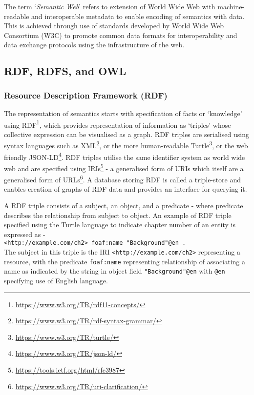 The term `\textit{Semantic Web}' refers to extension of World Wide Web with machine-readable and interoperable metadata to enable encoding of semantics with data.
This is achieved through use of standards developed by World Wide Web Consortium (W3C) to promote common data formats for interoperability and data exchange protocols using the infrastructure of the web.

\subsection{RDF, RDFS, and OWL}

\subsubsection{Resource Description Framework (RDF)}
The representation of semantics starts with specification of facts or `knowledge' using RDF\footnote{\url{https://www.w3.org/TR/rdf11-concepts/}}, which provides representation of information as `triples' whose collective expression can be visualised as a graph.
RDF triples are serialised using syntax languages such as XML\footnote{\url{https://www.w3.org/TR/rdf-syntax-grammar/}}, or the more human-readable Turtle\footnote{\url{https://www.w3.org/TR/turtle/}}, or the web friendly JSON-LD\footnote{\url{https://www.w3.org/TR/json-ld/}}.
RDF triples utilise the same identifier system as world wide web and are specified using IRIs\footnote{\url{https://tools.ietf.org/html/rfc3987}} - a generalised form of URIs which itself are a generalised form of URLs\footnote{\url{https://www.w3.org/TR/uri-clarification/}}.
A database storing RDF is called a triple-store and enables creation of graphs of RDF data and provides an interface for querying it.

A RDF triple consists of a subject, an object, and a predicate - where predicate describes the relationship from subject to object. An example of RDF triple specified using the Turtle language to indicate chapter number of an entity is expressed as -\\ \-\hspace{5mm}\texttt{<http://example.com/ch2> foaf:name "Background"@en .}\\
The subject in this triple is the IRI \texttt{<http://example.com/ch2>} representing a resource, with the predicate \texttt{foaf:name} representing relationship of associating a name as indicated by the string in object field \texttt{"Background"@en} with \texttt{@en} specifying use of English language. 

